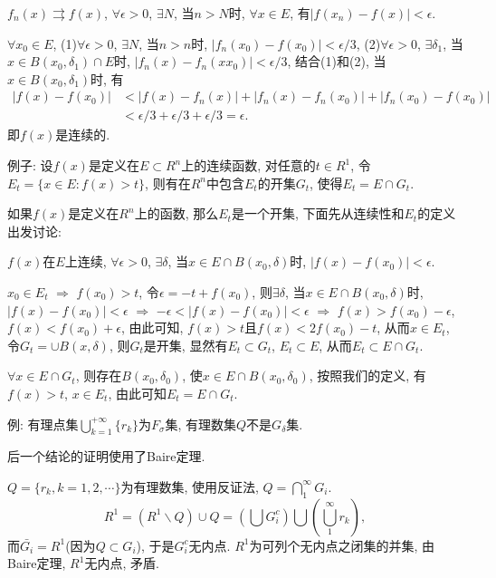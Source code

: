 \documentclass[12pt,a4paper,openany]{book}
\begin{document}
\begin{enumerate}
$f_n(x) \rightrightarrows f(x)$, $\forall \epsilon > 0$, $\exists N$, 当$n > N$时, $\forall x \in E$, 有$|f(x_n) - f(x)| < \epsilon$.

$\forall x_0 \in E$, (1)$\forall \epsilon > 0$, $\exists N$, 当$n > n$时, $|f_n(x_0) - f(x_0)| < \epsilon / 3$, (2)$\forall \epsilon > 0$, $\exists \delta_1$, 当$x \in B(x_0, \delta_1) \cap E$时, $|f_n(x) - f_n(xx_0)| < \epsilon/3$, 结合(1)和(2), 当$x \in B(x_0, \delta_1)$时, 有
\[
\begin{aligned}
|f(x) - f(x_0)| &< |f(x) - f_n(x)| + |f_n(x) - f_n(x_0)| + |f_n(x_0) - f(x_0)|\\ 
&< \epsilon/3 + \epsilon/3 + \epsilon/3 = \epsilon.
\end{aligned}
\]
即$f(x)$是连续的.
\end{enumerate}

例子: 设$f(x)$是定义在$E \subset R^n$上的连续函数, 对任意的$t \in R^1$, 令$E_t = \{x \in E: f(x) > t\}$, 则有在$R^n$中包含$E_t$的开集$G_t$, 使得$E_t = E \cap G_t$.

如果$f(x)$是定义在$R^n$上的函数, 那么$E_t$是一个开集, 下面先从连续性和$E_t$的定义出发讨论:

$f(x)$在$E$上连续, $\forall \epsilon > 0$, $\exists \delta$, 当$x \in E \cap B(x_0, \delta)$时, $|f(x) - f(x_0)| < \epsilon$.

$x_0 \in E_t$ $\Rightarrow$ $f(x_0) > t$, 令$\epsilon = -t + f(x_0)$, 则$\exists \delta$, 当$x \in E \cap B(x_0, \delta)$时, $|f(x) - f(x_0)| < \epsilon$ $\Rightarrow$ $-\epsilon < |f(x) - f(x_0)| < \epsilon$ $\Rightarrow$ $f(x) > f(x_0) - \epsilon$, $f(x) < f(x_0) + \epsilon$, 由此可知, $f(x) > t$且$f(x) < 2f(x_0) - t$, 从而$x \in E_t$, 令$G_t = \cup{B(x, \delta)}$, 则$G_t$是开集, 显然有$E_t \subset G_t$, $E_t \subset E$, 从而$E_t \subset E \cap G_t$.

$\forall x \in E \cap G_t$, 则存在$B(x_0, \delta_0)$, 使$x \in E \cap B(x_0, \delta_0)$, 按照我们的定义, 有$f(x) > t$, $x \in E_t$, 由此可知$E_t = E \cap G_t$.

例: 有理点集$\bigcup_{k=1}^{+\infty}\{r_k\}$为$F_{\sigma}$集, 有理数集$Q$不是$G_{\delta}$集.

后一个结论的证明使用了Baire定理.

$Q = \{r_k, k=1,2,\cdots\}$为有理数集, 使用反证法, $Q = \bigcap_{1}^{\infty}{G_i}$. 
\[
R^1 = (R^1 \backslash Q) \cup Q = (\bigcup{G_i^c}) \bigcup (\bigcup_{1}^{\infty}{r_k}),
\]
而$\bar{G_i} = R^1$(因为$Q \subset G_i$), 于是$G_i^c$无内点. $R^1$为可列个无内点之闭集的并集, 由Baire定理, $R^1$无内点, 矛盾.
\end{document}
